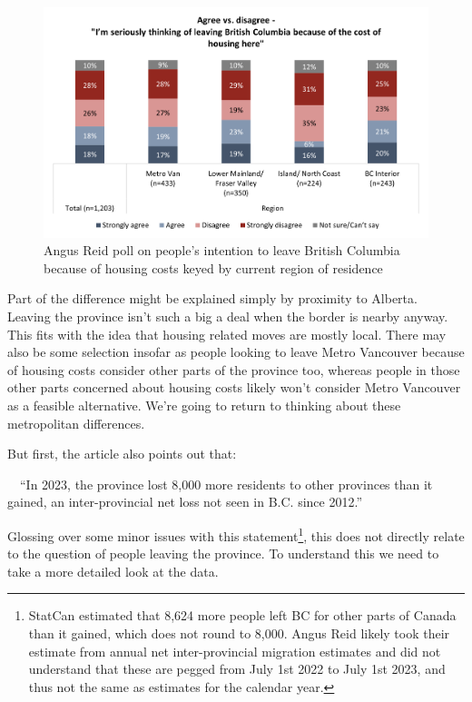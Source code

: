 \documentclass[
  letterpaper,
]{article}
\begin{document}
\begin{figure}[H]

{\centering \includegraphics{images/angus-reid-leaving-vancouver.png}

}

\caption{Angus Reid poll on people's intention to leave British Columbia
because of housing costs keyed by current region of residence}

\end{figure}%

Part of the difference might be explained simply by proximity to
Alberta. Leaving the province isn't such a big a deal when the border is
nearby anyway. This fits with the idea that housing related moves are
mostly local. There may also be some selection insofar as people looking
to leave Metro Vancouver because of housing costs consider other parts
of the province too, whereas people in those other parts concerned about
housing costs likely won't consider Metro Vancouver as a feasible
alternative. We're going to return to thinking about these metropolitan
differences.

But first, the article also points out that:

~~``In 2023, the province lost 8,000 more residents to other provinces
than it gained, an inter-provincial net loss not seen in B.C. since
2012.''

Glossing over some minor issues with this statement\footnote{StatCan
  estimated that 8,624 more people left BC for other parts of Canada
  than it gained, which does not round to 8,000. Angus Reid likely took
  their estimate from annual net inter-provincial migration estimates
  and did not understand that these are pegged from July 1st 2022 to
  July 1st 2023, and thus not the same as estimates for the calendar
  year.}, this does not directly relate to the question of people
leaving the province. To understand this we need to take a more detailed
look at the data.
\end{document}
